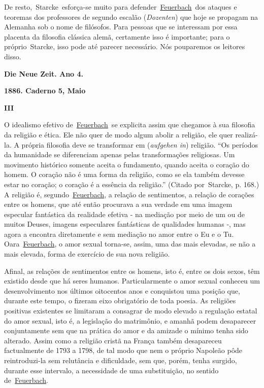 De resto,~Starcke~esforça-se muito para
defender~\href{https://www.marxists.org/portugues/dicionario/verbetes/f/feuerbach.htm}{Feuerbach}~dos
ataques e teoremas dos professores de segundo escalão (\emph{Dozenten})
que hoje se propagam na Alemanha sob o nome de filósofos. Para pessoas
que se interessam por essa placenta da filosofia clássica alemã,
certamente isso é importante; para o próprio~Starcke, isso pode até
parecer necessário. Nós pouparemos os leitores disso.

\textbf{Die Neue Zeit. Ano 4.}

\textbf{1886. Caderno 5, Maio}

\textbf{III}

O idealismo efetivo
de~\href{https://www.marxists.org/portugues/dicionario/verbetes/f/feuerbach.htm}{Feuerbach}~se
explicita assim que chegamos à sua filosofia da religião e ética. Ele
não quer de modo algum abolir a religião, ele quer realizá-la. A própria
filosofia deve se transformar em (\emph{aufgehen in}) religião. ``Os
períodos da humanidade se diferenciam apenas pelas transformações
religiosas. Um movimento histórico somente aceita o fundamento, quando
aceita o coração do homem. O coração não é uma forma da religião, como
se ela também devesse estar no coração; o coração é a essência da
religião.'' (Citado por~Starcke, p. 168.) A religião é,
segundo~\href{https://www.marxists.org/portugues/dicionario/verbetes/f/feuerbach.htm}{Feuerbach},
a relação de sentimentos, a relação de corações entre os homens, que até
então procurava a sua verdade em uma imagem especular fantástica da
realidade efetiva - na mediação por meio de um ou de muitos Deuses,
imagens especulares fantásticas de qualidades humanas -, mas agora a
encontra diretamente e sem mediação no amor entre o Eu e o Tu.
Oara~\href{https://www.marxists.org/portugues/dicionario/verbetes/f/feuerbach.htm}{Feuerbach},
o amor sexual torna-se, assim, uma das mais elevadas, se não a mais
elevada, forma de exercício de sua nova religião.

Afinal, as relações de sentimentos entre os homens, isto é, entre os
dois sexos, têm existido desde que há seres humanos. Particularmente o
amor sexual conheceu um desenvolvimento nos últimos oitocentos anos e
conquistou uma posição que, durante este tempo, o fizeram eixo
obrigatório de toda poesia. As religiões positivas existentes se
limitaram a consagrar de modo elevado a regulação estatal do amor
sexual, isto é, a legislação do matrimônio, e amanhã podem desaparecer
conjuntamente sem que na prática do amor e da amizade o mínimo tenha
sido alterado. Assim como a religião cristã na França também desapareceu
factualmente de 1793 a 1798, de tal modo que nem o próprio Napoleão pôde
reintroduzi-la sem relutância e dificuldade, sem que, porém, tenha
surgido, durante esse intervalo, a necessidade de uma substituição, no
sentido
de~\href{https://www.marxists.org/portugues/dicionario/verbetes/f/feuerbach.htm}{Feuerbach}.

